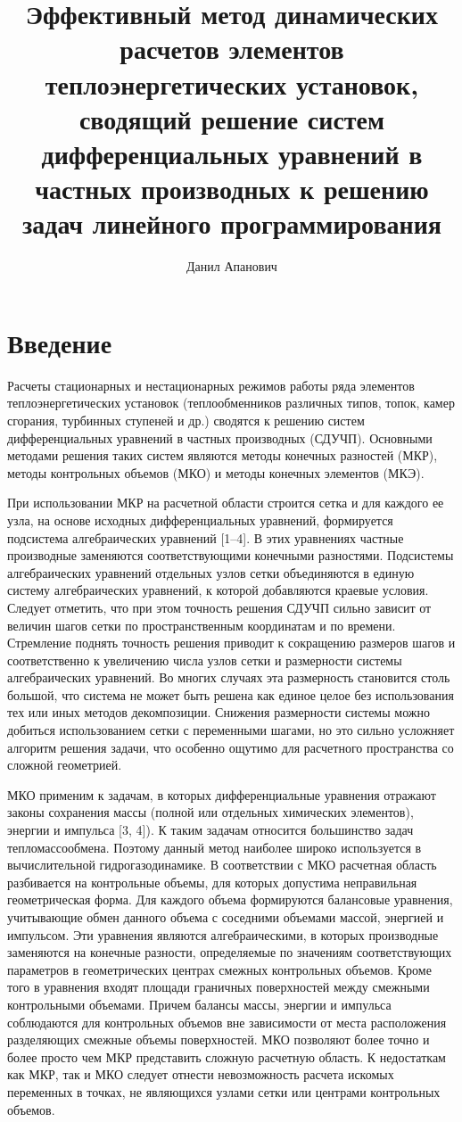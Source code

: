 \documentclass[a4paper,12pt]{article}
\title{Эффективный метод динамических расчетов элементов
теплоэнергетических установок, сводящий решение систем дифференциальных
уравнений в частных производных к решению задач линейного программирования}
\author{Данил Апанович}
\begin{document}
\maketitle

\section{Введение} 

Расчеты стационарных и нестационарных режимов работы ряда элементов
теплоэнергетических установок (теплообменников различных типов, топок,
камер сгорания, турбинных ступеней и др.) сводятся к решению систем
дифференциальных уравнений в частных производных (СДУЧП). Основными
методами решения таких систем являются методы конечных разностей (МКР),
методы контрольных объемов (МКО) и методы конечных элементов (МКЭ).  

При использовании МКР на расчетной области строится сетка и для каждого ее
узла, на основе исходных дифференциальных уравнений, формируется подсистема
алгебраических уравнений [1–4]. В этих уравнениях частные производные
заменяются соответствующими конечными разностями. Подсистемы алгебраических
уравнений отдельных узлов сетки объединяются в единую систему
алгебраических уравнений, к которой добавляются краевые условия. Следует
отметить, что при этом точность решения СДУЧП сильно зависит от величин
шагов сетки по пространственным координатам и по времени. Стремление
поднять точность решения приводит к сокращению размеров шагов и
соответственно к увеличению числа узлов сетки и размерности системы
алгебраических уравнений. Во многих случаях эта размерность становится
столь большой, что система не может быть решена как единое целое без
использования тех или иных методов декомпозиции.  Снижения размерности
системы можно добиться использованием сетки с переменными шагами, но это
сильно усложняет алгоритм решения задачи, что особенно ощутимо для
расчетного пространства со сложной геометрией.

МКО применим к задачам, в которых дифференциальные уравнения отражают
законы сохранения массы (полной или отдельных химических элементов),
энергии и импульса [3, 4]). К таким задачам относится большинство задач
тепломассообмена.  Поэтому данный метод наиболее широко используется в
вычислительной гидрогазодинамике. В соответствии с МКО расчетная область
разбивается на контрольные объемы, для которых допустима неправильная
геометрическая форма.  Для каждого объема формируются балансовые уравнения,
учитывающие обмен данного объема с соседними объемами массой, энергией и
импульсом. Эти уравнения являются алгебраическими, в которых производные
заменяются на конечные разности, определяемые по значениям соответствующих
параметров в геометрических центрах смежных контрольных объемов. Кроме того
в уравнения входят площади граничных поверхностей между смежными
контрольными объемами. Причем балансы массы, энергии и импульса соблюдаются
для контрольных объемов вне зависимости от места расположения разделяющих
смежные объемы поверхностей. МКО позволяют более точно и более просто чем
МКР представить сложную расчетную область.  К недостаткам как МКР, так и
МКО следует отнести невозможность расчета искомых переменных в точках, не
являющихся узлами сетки или центрами контрольных объемов.
\end{document}
